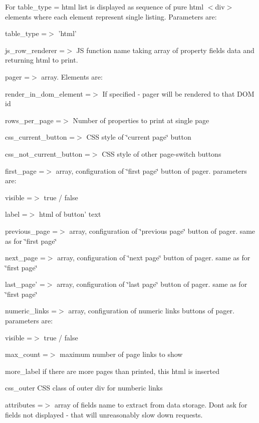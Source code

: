 For table\_\-type = html list is displayed as sequence of pure html $<$div$>$ elements where each element represent single listing. Parameters are:
\begin{DoxyItemize}
\item table\_\-type =$>$ 'html'
\item js\_\-row\_\-renderer =$>$ JS function name taking array of property fields data and returning html to print.
\item pager =$>$ array. Elements are:
\begin{DoxyItemize}
\item render\_\-in\_\-dom\_\-element =$>$ If specified -\/ pager will be rendered to that DOM id
\item rows\_\-per\_\-page =$>$ Number of properties to print at single page
\item css\_\-current\_\-button =$>$ CSS style of \char`\"{}current page\char`\"{} button
\item css\_\-not\_\-current\_\-button =$>$ CSS style of other page-\/switch buttons
\item first\_\-page =$>$ array, configuration of \char`\"{}first page\char`\"{} button of pager. parameters are:
\begin{DoxyItemize}
\item visible =$>$ true / false
\item label =$>$ html of button' text
\end{DoxyItemize}
\item previous\_\-page =$>$ array, configuration of \char`\"{}previous page\char`\"{} button of pager. same as for \char`\"{}first page\char`\"{}
\item next\_\-page =$>$ array, configuration of \char`\"{}next page\char`\"{} button of pager. same as for \char`\"{}first page\char`\"{}
\item last\_\-page' =$>$ array, configuration of \char`\"{}last page\char`\"{} button of pager. same as for \char`\"{}first page\char`\"{}
\item numeric\_\-links =$>$ array, configuration of numeric links buttons of pager. parameters are:
\begin{DoxyItemize}
\item visible =$>$ true / false
\item max\_\-count =$>$ maximum number of page links to show
\item more\_\-label if there are more pages than printed, this html is inserted
\item css\_\-outer CSS class of outer div for numberic links
\end{DoxyItemize}
\end{DoxyItemize}
\item attributes =$>$ array of fields name to extract from data storage. Dont ask for fields not displayed -\/ that will unreasonably slow down requests. 
\end{DoxyItemize}\hypertarget{placester_8php_af1e56404742272b311a0332012dd4307}{
}
